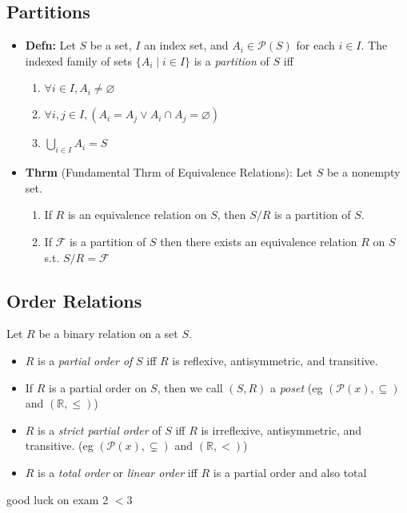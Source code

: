 \documentclass[11pt]{article}
\theoremstyle{definition}
\newcommand{\bb}[1]{\mathbb{#1}}
\begin{document}
\subsection*{Partitions}
\begin{itemize}
    \item \textbf{Defn:} Let $S$ be a set, $I$ an index set, and $A_i\in\mathcal{P}(S)$ for each $i\in I$. The indexed family of sets $\{A_i\mid i\in I\}$ is a \emph{partition} of $S$ iff
    \begin{enumerate}
        \item $\forall i\in I, A_i \ne \varnothing$
        \item $\forall i,j\in I, (A_i = A_j \lor A_i \cap A_j = \varnothing)$
        \item $\bigcup_{i\in I}A_i = S$
    \end{enumerate}
    \item \textbf{Thrm} (Fundamental Thrm of Equivalence Relations): Let $S$ be a nonempty set.
    \begin{enumerate}
        \item If $R$ is an equivalence relation on $S$, then $S/R$ is a partition of $S$.
        \item If $\mathcal{F}$ is a partition of $S$ then there exists an equivalence relation $R$ on $S$ s.t. $S/R=\mathcal{F}$
    \end{enumerate}
\end{itemize}
\subsection*{Order Relations}
Let $R$ be a binary relation on a set $S$.
\begin{itemize}
    \item $R$ is a \emph{partial order of} $S$ iff $R$ is reflexive, antisymmetric, and transitive.
    \item If $R$ is a partial order on $S$, then we call $(S,R)$ a \emph{poset} (eg $(\mathcal{P}(x),\subseteq)$ and $(\bb{R}, \le)$)
    \item $R$ is a \emph{strict partial order} of $S$ iff $R$ is irreflexive, antisymmetric, and transitive. (eg $(\mathcal{P}(x),\subsetneq)$ and $(\bb{R},<)$)
    \item $R$ is a \emph{total order} or \emph{linear order} iff $R$ is a partial order and also total
\end{itemize}
good luck on exam 2 $<$3
\end{document}
